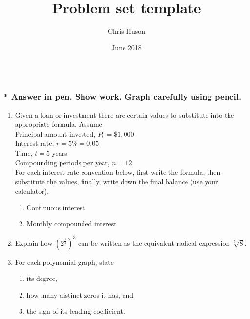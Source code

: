 \documentclass[12pt, oneside]{article}
\title{Problem set template}
\author{Chris Huson}
\date{June 2018}
\begin{document}

\subsubsection*{\\* \textnormal{Answer in pen. Show work. Graph carefully using pencil.}}

\begin{enumerate}
\item Given a loan or investment there are certain values to substitute into the appropriate formula. Assume\\[5pt]
\quad Principal amount invested, $P_0= \$1,000$\\[5pt]
\quad Interest rate, $r=5\% = 0.05$\\[5pt]
\quad Time, $t=5$ years \\[5pt]
\quad Compounding periods per year, $n=12$\\[15pt]
For each interest rate convention below, first write the formula, then substitute the values, finally, write down the final balance (use your calculator). 

\begin{enumerate}
    \item Continuous interest \\[1.25in]
    \item Monthly compounded interest \\[1.5in]
\end{enumerate}

\item Explain how $\displaystyle \left(2^{\frac{1}{5}} \right)^3$ can be written as the equivalent radical expression $\sqrt[5]8$. %

\newpage
\item For each polynomial graph, state 
\begin{enumerate}
\item its degree,
\item how many distinct zeros it has, and
\item the sign of its leading coefficient.
\end{enumerate}


\end{enumerate}
\end{document}
